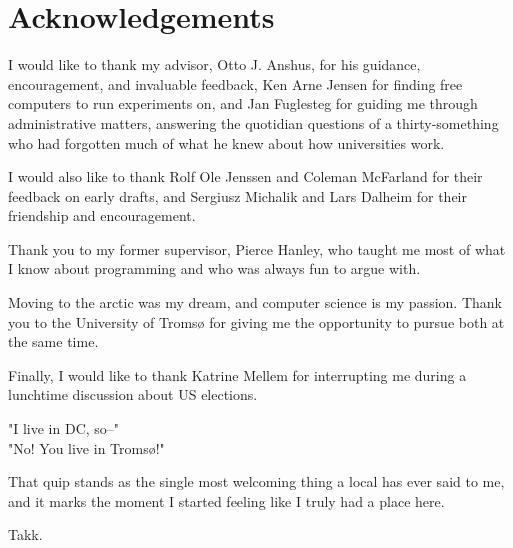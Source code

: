 \chapter{Acknowledgements}

I would like to thank my advisor, Otto J. Anshus, for his guidance,
encouragement, and invaluable feedback, Ken Arne Jensen for finding free
computers to run experiments on, and Jan Fuglesteg for guiding me through
administrative matters, answering the quotidian questions of a thirty-something
who had forgotten much of what he knew about how universities work.

I would also like to thank Rolf Ole Jenssen and Coleman McFarland for their
feedback on early drafts, and Sergiusz Michalik and Lars Dalheim for their
friendship and encouragement.

Thank you to my former supervisor, Pierce Hanley, who taught me most of what I
know about programming and who was always fun to argue with.

Moving to the arctic was my dream, and computer science is my passion.
Thank you to the University of Tromsø for giving me the opportunity to pursue
both at the same time.

Finally, I would like to thank Katrine Mellem for interrupting me during a
lunchtime discussion about US elections.

"I live in DC, so--"\\
"No! You live in Tromsø!"

That quip stands as the single most welcoming thing a local has ever said to me,
and it marks the moment I started feeling like I truly had a place here.

Takk.
